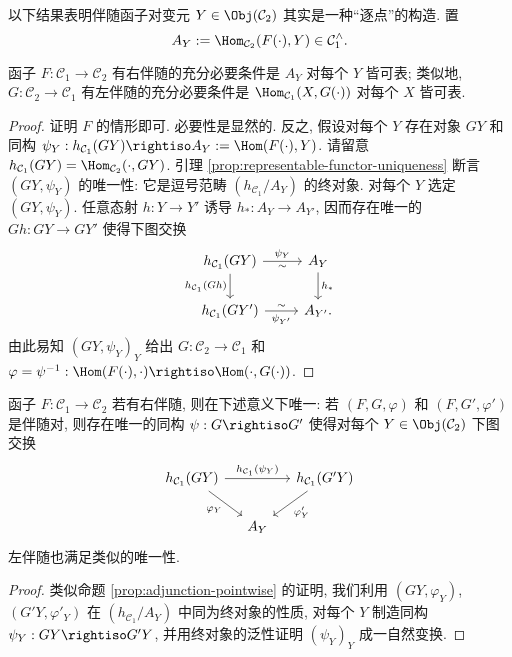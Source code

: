 以下结果表明伴随函子对变元 $Y \in \Obj(\mathcal{C}_2)$ 其实是一种``逐点''的构造. 置
\[ A_Y := \Hom_{\mathcal{C}_2}(F(\cdot), Y) \in \mathcal{C}_1^\wedge. \]

\begin{proposition}\label{prop:adjunction-pointwise}
	函子 $F: \mathcal{C}_1 \to \mathcal{C}_2$ 有右伴随的充分必要条件是 $A_Y$ 对每个 $Y$ 皆可表; 类似地, $G: \mathcal{C}_2 \to \mathcal{C}_1$ 有左伴随的充分必要条件是 $\Hom_{\mathcal{C}_1}(X, G(\cdot))$ 对每个 $X$ 皆可表.
\end{proposition}
\begin{proof}
	证明 $F$ 的情形即可. 必要性是显然的. 反之, 假设对每个 $Y$ 存在对象 $GY$ 和同构 $\psi_Y: h_{\mathcal{C}_1}(GY) \rightiso A_Y := \Hom(F(\cdot), Y)$.  请留意 $h_{\mathcal{C}_1}(GY) = \Hom_{\mathcal{C}_2}(\cdot, GY)$. 引理 \ref{prop:representable-functor-uniqueness} 断言 $(GY, \psi_Y)$ 的唯一性: 它是逗号范畴 $(h_{\mathcal{C}_1} / A_Y)$ 的终对象. 对每个 $Y$ 选定 $(GY, \psi_Y)$. 任意态射 $h: Y \to Y'$ 诱导 $h_*: A_Y \to A_{Y'}$, 因而存在唯一的 $Gh: GY \to GY'$ 使得下图交换
	\[ \begin{tikzcd}
		h_{\mathcal{C}_1}(GY) \arrow[d, "{h_{\mathcal{C}_1}(Gh)}"'] \arrow[r, "\psi_Y", "\sim"'] & A_Y \arrow[d, "h_*"] \\
		h_{\mathcal{C}_1}(GY') \arrow[r, "{\psi_{Y'}}"', "\sim"] & A_{Y'} .
	\end{tikzcd} \]
	由此易知 $(GY, \psi_Y)_Y$ 给出 $G: \mathcal{C}_2 \to \mathcal{C}_1$ 和 $\varphi = \psi^{-1}: \Hom(F(\cdot), \cdot) \rightiso \Hom(\cdot, G(\cdot))$.
\end{proof}

\begin{proposition}\label{prop:adjunction-uniqueness}
	函子 $F: \mathcal{C}_1 \to \mathcal{C}_2$ 若有右伴随, 则在下述意义下唯一: 若 $(F, G, \varphi)$ 和 $(F, G', \varphi')$ 是伴随对, 则存在唯一的同构 $\psi: G \rightiso G'$ 使得对每个 $Y \in \Obj(\mathcal{C}_2)$ 下图交换
	\[ \begin{tikzcd}[column sep=small]
		h_{\mathcal{C}_1}(GY) \arrow[rr, "{h_{\mathcal{C}_1}(\psi_Y)}"] \arrow[rd, "\varphi_Y"'] & & h_{\mathcal{C}_1}(G'Y) \arrow[ld, "{{\varphi}'_Y}"] \\
		& A_Y &
	\end{tikzcd} \]
	左伴随也满足类似的唯一性.
\end{proposition}
\begin{proof}
	类似命题 \ref{prop:adjunction-pointwise} 的证明, 我们利用 $(GY, \varphi_Y)$, $(G'Y, {\varphi}'_Y)$ 在 $(h_{\mathcal{C}_1} / A_Y)$ 中同为终对象的性质, 对每个 $Y$ 制造同构 $\psi_Y: GY \rightiso G'Y$, 并用终对象的泛性证明 $(\psi_Y)_Y$ 成一自然变换.
\end{proof}

